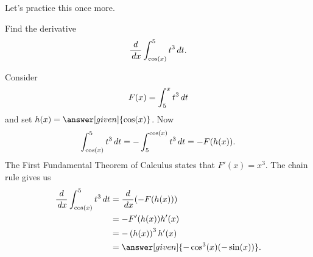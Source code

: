 \documentclass{ximera}
\begin{document}
Let's practice this once more.

\begin{example}
  Find the
  derivative 
  \[
 \frac{d}{\,d x}\int_{\cos(x)}^5 t^3\,d t.
  \]
  \begin{explanation}
    Consider
    \[
    F(x) = \int_5^x t^3 \,d t
    \]
    and set $h(x) = \answer[given]{\cos(x)}$. Now
    \[
  \int_{\cos(x)}^5 t^3\,d t =- \int_{5}^{\cos(x)} t^3\,d t = -F(h(x)).
    \]
    The First Fundamental Theorem of Calculus states that $F'(x) = x^3$. The chain rule gives us
    \begin{align*}
      \ddx\int_{\cos(x)}^5 t^3\d t &=  \ddx (-F(h(x)))\\
     &= -F'(h(x))h'(x)\\
      &=-\left(h(x)\right)^3 h'(x)\\
      &=\answer[given]{-\cos^3(x) (-\sin(x))}.
    \end{align*}
  \end{explanation}
\end{example}
\end{document}
